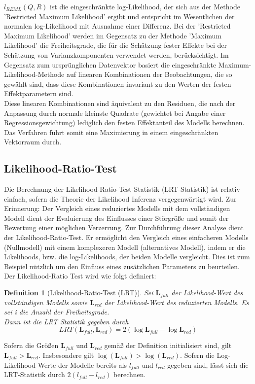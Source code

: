 \documentclass[%
thesis=student,%
coverpage=false,%
titlepage=false,%
headmarks=true, %
german,%
font=libertine, %
math=newpxtx, %
BCOR=5mm,%
coverBCOR=11mm%
]{tumbook}
\theoremstyle{break}
\newtheorem{definition}{Definition}[section]
\begin{document}
$l_{REML}(Q,R)$ ist die eingeschränkte log-Likelihood, der sich aus der Methode 'Restricted Maximum Likelihood' ergibt und entspricht im Wesentlichen der normalen log-Likelihood mit Ausnahme einer Differenz. Bei der 'Restricted Maximum Likelihood' werden im Gegensatz zu der Methode 'Maximum Likelihood' die Freiheitsgrade, die für die Schätzung fester Effekte bei der Schätzung von Varianzkomponenten verwendet werden, berücksichtigt. Im Gegensatz zum ursprünglichen Datenvektor basiert die eingeschränkte Maximum-Likelihood-Methode auf linearen Kombinationen der Beobachtungen, die so gewählt sind, dass diese Kombinationen invariant zu den Werten der festen Effektparametern sind. \\
Diese linearen Kombinationen sind äquivalent zu den Residuen, die nach der Anpassung durch normale kleinste Quadrate (gewichtet bei Angabe einer Regressionsgewichtung) lediglich den festen Effektanteil des Modells berechnen. Das Verfahren führt somit eine Maximierung in einem eingeschränkten Vektorraum durch.
\subsection{Likelihood-Ratio-Test}
Die Berechnung der Likelihood-Ratio-Test-Statistik (LRT-Statistik) ist relativ einfach, sofern die Theorie der Likelihood Inferenz vergegenwärtigt wird. Zur Erinnerung: Der Vergleich eines reduziertes Modells mit dem vollständigen Modell dient der Evaluierung des Einflusses einer Störgröße und somit der Bewertung einer möglichen Verzerrung. Zur Durchführung dieser Analyse dient der Likelihood-Ratio-Test. Er ermöglicht den Vergleich eines einfacheren Modells (Nullmodell) mit einem komplexeren Modell (alternatives Modell), indem er die Likelihoods, bzw. die log-Likelihoods, der beiden Modelle vergleicht. Dies ist zum Beispiel nützlich um den Einfluss eines zusätzlichen Parameters zu beurteilen.\\
Der Likelihood-Ratio Test wird wie folgt definiert:\\
\begin{definition}[Likelihood-Ratio-Test (LRT)] 
	Sei $\mathbf{L}_{full}$ der Likelihood-Wert des vollständigen Modells sowie $\mathbf{L}_{red}$ der Likelihood-Wert des reduzierten Modells. Es sei i die Anzahl der Freiheitsgrade.\\
	Dann ist die LRT Statistik gegeben durch 
	$$ LRT(\mathbf{L}_{full}, \mathbf{L}_{red}) = 2(\log \mathbf{L}_{full}- \log \mathbf{L}_{red}) $$ 
\end{definition} \noindent
Sofern die Größen $\mathbf{L}_{full}$ und $\mathbf{L}_{red}$ gemäß der Definition initialisiert sind, gilt $\mathbf{L}_{full} > \mathbf{L}_{red}$. Insbesondere gilt $\log(\mathbf{L}_{full}) > \log(\mathbf{L}_{red})$.
Sofern die Log-Likelihood-Werte der Modelle bereits als $l_{full}$ und $l_{red}$ gegeben sind, lässt sich die LRT-Statistik durch $2(l_{full} - l_{red})$ berechnen. \\
\\
\end{document}

